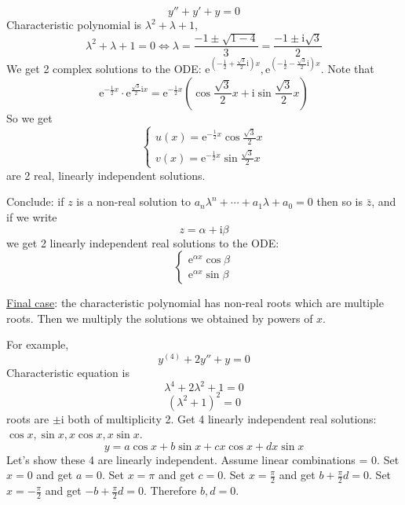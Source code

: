 \documentclass{article}
\newcommand{\mathe}{\mathrm{e}}
\newcommand{\mathi}{\mathrm{i}}
\newcommand{\mathpi}{\pi}
\begin{document}
\[ y'' + y' + y = 0 \]
Characteristic polynomial is $\lambda^2 + \lambda + 1$,
\[ \lambda^2 + \lambda + 1 = 0 \Longleftrightarrow \lambda = \frac{- 1 \pm
   \sqrt{1 - 4}}{3} = \frac{- 1 \pm \mathi \sqrt{3}}{2} \]
We get 2 complex solutions to the ODE: $\mathe^{\left( - \frac{1}{2} +
\frac{\sqrt{3}}{2} \mathi \right) x}, \mathe^{\left( - \frac{1}{2} -
\frac{\sqrt{3}}{2} \mathi \right) x}$. Note that
\[ \mathe^{- \frac{1}{2} x} \cdot \mathe^{\frac{\sqrt{3}}{2} \mathi x} =
   \mathe^{- \frac{1}{2} x}  \left( \cos \frac{\sqrt{3}}{2} x + \mathi \sin
   \frac{\sqrt{3}}{2} x \right) \]
So we get
\[ \left\{\begin{array}{l}
     u (x) = \mathe^{- \frac{1}{2} x} \cos \frac{\sqrt{3}}{2} x\\
     v (x) = \mathe^{- \frac{1}{2} x} \sin \frac{\sqrt{3}}{2} x
   \end{array}\right. \]
are 2 real, linearly independent solutions.

\begin{tmornamented}
  Conclude: if $z$ is a non-real solution to $a_n \lambda^n + \cdots + a_1
  \lambda + a_0 = 0$ then so is $\bar{z}$, and if we write
  \[ z = \alpha + \mathi \beta \]
  we get 2 linearly independent real solutions to the ODE:
  \[ \left\{\begin{array}{l}
       \mathe^{\alpha x} \cos \beta\\
       \mathe^{\alpha x} \sin \beta
     \end{array}\right. \]
\end{tmornamented}

{\underline{Final case}}: the characteristic polynomial has non-real roots
which are multiple roots. Then we multiply the solutions we obtained by powers
of $x$.

For example,
\[ y^{(4)} + 2 y'' + y = 0 \]
Characteristic equation is
\[ \lambda^4 + 2 \lambda^2 + 1 = 0 \]
\[ (\lambda^2 + 1)^2 = 0 \]
roots are $\pm \mathi$ both of multiplicity 2. Get 4 linearly independent real
solutions: {$\cos x, \sin x, x \cos x, x \sin x$}.
\[ y = a \cos x + b \sin x + cx \cos x + dx \sin x \]
Let's show these 4 are linearly independent. Assume linear combinations = 0.
Set $x = 0$ and get $a = 0$. Set $x = \mathpi$ and get $c = 0$. Set $x =
\frac{\mathpi}{2}$ and get $b + \frac{\mathpi}{2} d = 0$. Set $x = -
\frac{\mathpi}{2}$ and get $- b + \frac{\mathpi}{2} d = 0$. Therefore $b, d =
0$.
\end{document}
